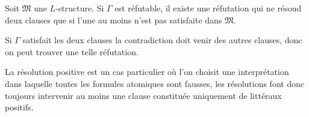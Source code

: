 \documentclass[a4paper]{article}
\begin{document}
\begin{theorem}
  Soit $\mathfrak{M}$ une $L$-structure. Si $\Gamma$ est réfutable, il existe une réfutation qui ne résoud deux clauses que si l'une au moins n'est pas satisfaite dans $\mathfrak{M}$.
\end{theorem}

Si $\Gamma$ satisfait les deux clauses la contradiction doit venir des autres clauses, donc on peut trouver une telle réfutation.

La résolution positive est un cas particulier où l'on choisit une interprétation dans laquelle toutes les formules atomiques sont fausses, les résolutions font donc toujours intervenir au moins une clause constituée uniquement de littéraux positifs.
\end{document}
